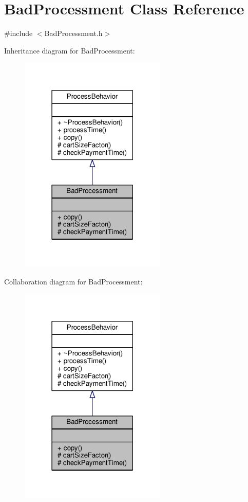 \hypertarget{classBadProcessment}{\section{Bad\-Processment Class Reference}
\label{classBadProcessment}
}


{\ttfamily \#include $<$Bad\-Processment.\-h$>$}



Inheritance diagram for Bad\-Processment\-:\nopagebreak
\begin{figure}[H]
\begin{center}
\leavevmode
\includegraphics[width=198pt]{classBadProcessment__inherit__graph}
\end{center}
\end{figure}


Collaboration diagram for Bad\-Processment\-:\nopagebreak
\begin{figure}[H]
\begin{center}
\leavevmode
\includegraphics[width=198pt]{classBadProcessment__coll__graph}
\end{center}
\end{figure}
